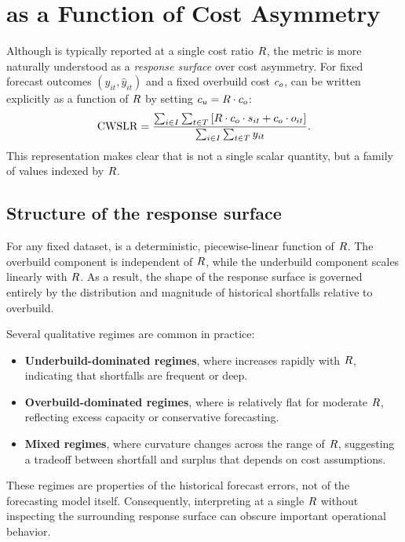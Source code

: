 \section{\CWSL{} as a Function of Cost Asymmetry}
\label{sec:response_surface}

Although \CWSL{} is typically reported at a single cost ratio $R$, the metric is
more naturally understood as a \emph{response surface} over cost asymmetry.
For fixed forecast outcomes $(y_{it}, \hat{y}_{it})$ and a fixed overbuild cost
$c_o$, \CWSL{} can be written explicitly as a function of $R$ by setting
$c_u = R \cdot c_o$:
\[
    \CWSLR =
    \frac{
        \sumit
        \left[
            \R \cdot \co \cdot \sit
            +
            \co \cdot \oit
        \right]
    }{
        \sumit \yit
    }.
\]
This representation makes clear that \CWSL{} is not a single scalar quantity, but
a family of values indexed by $R$.

\subsection{Structure of the response surface}
\label{subsec:surface_structure}

For any fixed dataset, \CWSLR{} is a deterministic, piecewise-linear function of
$R$.
The overbuild component is independent of $R$, while the underbuild component
scales linearly with $R$.
As a result, the shape of the response surface is governed entirely by the
distribution and magnitude of historical shortfalls relative to overbuild.

Several qualitative regimes are common in practice:
\begin{itemize}[leftmargin=*]
    \item \textbf{Underbuild-dominated regimes}, where \CWSLR{} increases rapidly
    with $R$, indicating that shortfalls are frequent or deep.
    \item \textbf{Overbuild-dominated regimes}, where \CWSLR{} is relatively flat
    for moderate $R$, reflecting excess capacity or conservative forecasting.
    \item \textbf{Mixed regimes}, where curvature changes across the range of
    $R$, suggesting a tradeoff between shortfall and surplus that depends on
    cost assumptions.
\end{itemize}

These regimes are properties of the historical forecast errors, not of the
forecasting model itself. Consequently, interpreting \CWSL{} at a single
$R$ without inspecting the surrounding response surface can obscure important
operational behavior.

